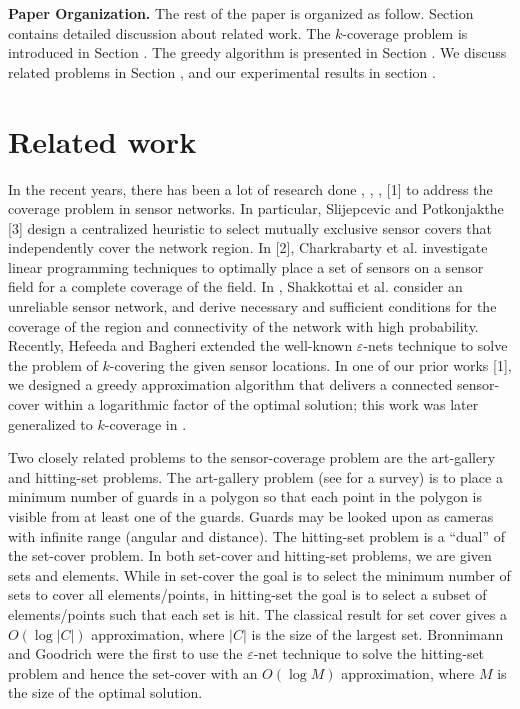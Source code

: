 \documentclass[conference]{IEEEtran}
\theoremstyle{definition}
\newtheorem*{NP-Hardness of Approximating the SODkC Problem}{NP-Hardness of Approximating the SODkC Problem}
\newtheorem*{Greedy Algorithm (GA)}{Greedy Algorithm (GA)}
\newtheorem*{GA on the Running Example}{GA on the Running Example}
\newtheorem*{Performance Guarantee of GA}{Performance Guarantee of GA}
\begin{document}
\noindent\textbf{Paper Organization.} The rest of the paper is organized as follow. Section \uppercase\expandafter{} contains detailed discussion about related work. The $k$-coverage problem is introduced in Section \uppercase\expandafter{}. The greedy algorithm is presented in Section \uppercase\expandafter{}. We discuss related problems in Section \uppercase\expandafter{}, and our experimental results in section \uppercase\expandafter{}.

\section{Related work}
In the recent years, there has been a lot of research done \cite{1146711}, \cite{936985}, \cite{1181406}, [1] to address the coverage problem in sensor networks. In particular, Slijepcevic and Potkonjakthe [3] design a centralized heuristic to select mutually exclusive sensor covers that independently cover the network region. In [2], Charkrabarty et al. investigate linear programming techniques to optimally place a set of sensors on a sensor field for a complete coverage of the field. In \cite{1208944}, Shakkottai et al. consider an unreliable sensor network, and derive necessary and sufficient conditions for the coverage of the region and connectivity of the network with high probability. Recently, Hefeeda and Bagheri \cite{4215866} extended the well-known $\varepsilon$-nets technique to solve the problem of $k$-covering the given sensor locations. In one of our prior works [1], we designed a greedy approximation algorithm that delivers a connected sensor-cover within a logarithmic factor of the optimal solution; this work was later generalized to $k$-coverage in \cite{1401672}.

Two closely related problems to the sensor-coverage problem are the art-gallery and hitting-set problems. The art-gallery problem (see \cite{10.5555/40599} for a survey) is to place a minimum number of guards in a polygon so that each point in the polygon is visible from at least one of the guards. Guards may be looked upon as cameras with infinite range (angular and distance). The hitting-set problem is a “dual” of the set-cover problem. In both set-cover and hitting-set problems, we are given sets and elements. While in set-cover the goal is to select the minimum number of sets to cover all elements/points, in hitting-set the goal is to select a subset of elements/points such that each set is hit. The classical result for set cover \cite{10.5555/580470} gives a $O(\log |C|)$ approximation, where $|C|$ is the size of the largest set. Bronnimann and Goodrich \cite{10.1007/BF02570718} were the first to use the $\varepsilon$-net technique \cite{10.1007/BF02187876} to solve the hitting-set problem and hence the set-cover with an $O(\log M)$ approximation, where $M$ is the size of the optimal solution.
\end{document}
